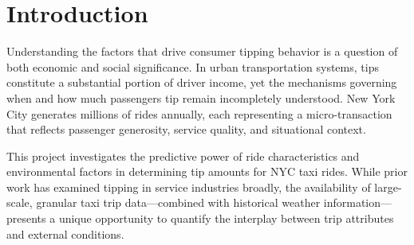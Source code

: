 \documentclass[11pt]{article}
\begin{document}
\begin{abstract}
This project explores how ride characteristics and environmental factors influence tipping behavior in New York City taxis. Using publicly available NYC Taxi and Limousine Commission (TLC) datasets covering \textbf{green and yellow taxis from 2024}, combined with historical weather data, we aim to predict whether a ride receives a \textit{low}, \textit{medium}, or \textit{high} tip. We begin with Initial Data Analysis (IDA) to understand data quality and structure, identify missing or inconsistent entries, and engineer key features such as trip duration, distance, tip ratio, and weather conditions.

After cleaning and transformation, we trained multiple classification models, including Logistic Regression, Random Forests, Histogram Gradient Boosting, and a custom neural network implemented in PyTorch. The goal is to build a predictive system that reveals how ride and environmental factors jointly affect tip behavior.

Finally, we deployed a \textbf{Weighted Ensemble} mechanism within an interactive application to synthesize predictions from all models. The goal of this project is not only to build a reliable classification model but also to uncover the key ride and environmental factors that drive tipping behavior, providing interpretable insights into passenger generosity.
\end{abstract}

\section{Introduction}

Understanding the factors that drive consumer tipping behavior is a question of both economic and social significance. In urban transportation systems, tips constitute a substantial portion of driver income, yet the mechanisms governing when and how much passengers tip remain incompletely understood. New York City generates millions of rides annually, each representing a micro-transaction that reflects passenger generosity, service quality, and situational context.

This project investigates the predictive power of ride characteristics and environmental factors in determining tip amounts for NYC taxi rides. While prior work has examined tipping in service industries broadly, the availability of large-scale, granular taxi trip data—combined with historical weather information—presents a unique opportunity to quantify the interplay between trip attributes and external conditions.
\end{document}
